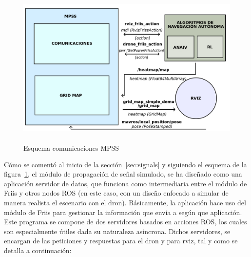 \begin{figure} [tp]
    \begin{center}
    \includegraphics[height=8cm]{imagenes/cap4/5_MPSS_esquema.png}
    \end{center}
	\caption[Esquema comunicaciones \ac{MPSS}]{Esquema comunicaciones \ac{MPSS}}
	\label{fig:esquema_mpss}
\end{figure}

Cómo se comentó al inicio de la sección~\ref{sec:signals} y siguiendo el esquema de la figura~\ref{fig:esquema_mpss}, el módulo de propagación de señal simulado, se ha diseñado como una aplicación servidor de datos, que funciona como intermediaria entre el módulo de Friis y otros nodos \ac{ROS} (en este caso, con un diseño enfocado a simular de manera realista el escenario con el dron). Básicamente, la aplicación hace uso del módulo de Friis para gestionar la información que envía a según que aplicación. Este programa se compone de dos servidores basados en acciones \ac{ROS}, los cuales son especialmente útiles dada su naturaleza asíncrona. Dichos servidores, se encargan de las peticiones y respuestas para el dron y para rviz, tal y como se detalla a continuación:

